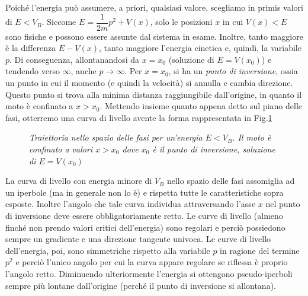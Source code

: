 \documentclass[a4paper,openany]{article}
\begin{document}
	Poiché l'energia può assumere, a priori, qualsiasi valore, scegliamo in primis valori di $E< V_{B}$. Siccome $E = \dfrac{1}{2m}p^{2} + V(x)$, solo le posizioni $x$ in cui $V(x) < E$ sono fisiche e possono essere assunte dal sistema in esame. Inoltre, tanto maggiore è la differenza $E-V(x)$, tanto maggiore l'energia cinetica e, quindi, la variabile $p$. Di conseguenza, allontanandosi da $x=x_{0}$ (soluzione di $E = V(x_0)$) e tendendo verso $\infty$, anche $p\to\infty$. Per $x=x_{0}$, si ha un \textit{punto di inversione}, ossia un punto in cui il momento (e quindi la velocità) si annulla e cambia direzione. Questo punto si trova alla minima distanza raggiungibile dall'origine, in quanto il moto è confinato a $x>x_0$. Mettendo insieme quanto appena detto sul piano delle fasi, otterremo una curva di livello avente la forma rappresentata in Fig.\ref{Fig10}
	\begin{figure}[H]
		\centering
		
		\caption{\textit{Traiettoria nello spazio delle fasi per un'energia $E<V_B$. Il moto è confinato a valori $x>x_0$ dove $x_0$ è il punto di inversione, soluzione di $E=V(x_0)$}}
		\label{Fig10}
	\end{figure}
	La curva di livello con energia minore di $V_B$ nello spazio delle fasi assomiglia ad un iperbole (ma in generale non lo è) e rispetta tutte le caratteristiche sopra esposte. Inoltre l'angolo che tale curva individua attraversando l'asse $x$ nel punto di inversione deve essere obbligatoriamente retto. Le curve di livello (almeno finché non prendo valori critici dell'energia) sono regolari e perciò possiedono sempre un gradiente e una direzione tangente univoca. Le curve di livello dell'energia, poi, sono simmetriche rispetto alla variabile $p$ in ragione del termine $p^{2}$ e perciò l'unico angolo per cui la curva appare regolare se riflessa è proprio l'angolo retto. Diminuendo ulteriormente l'energia si ottengono pseudo-iperboli sempre più lontane dall'origine (perché il punto di inversione si allontana).
	
\end{document}
